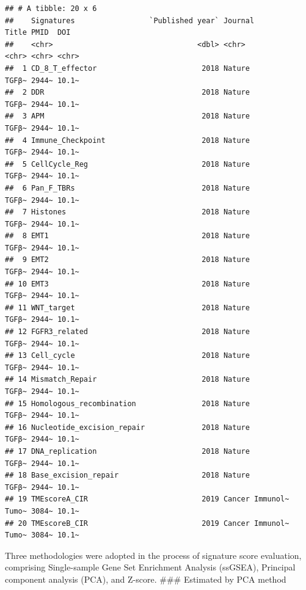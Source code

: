 \documentclass[
  12pt,
]{book}
\theoremstyle{definition}
\theoremstyle{definition}
\theoremstyle{definition}
\theoremstyle{definition}
\theoremstyle{remark}
\begin{document}
\begin{verbatim}
## # A tibble: 20 x 6
##    Signatures                 `Published year` Journal         Title PMID  DOI  
##    <chr>                                 <dbl> <chr>           <chr> <chr> <chr>
##  1 CD_8_T_effector                        2018 Nature          TGFβ~ 2944~ 10.1~
##  2 DDR                                    2018 Nature          TGFβ~ 2944~ 10.1~
##  3 APM                                    2018 Nature          TGFβ~ 2944~ 10.1~
##  4 Immune_Checkpoint                      2018 Nature          TGFβ~ 2944~ 10.1~
##  5 CellCycle_Reg                          2018 Nature          TGFβ~ 2944~ 10.1~
##  6 Pan_F_TBRs                             2018 Nature          TGFβ~ 2944~ 10.1~
##  7 Histones                               2018 Nature          TGFβ~ 2944~ 10.1~
##  8 EMT1                                   2018 Nature          TGFβ~ 2944~ 10.1~
##  9 EMT2                                   2018 Nature          TGFβ~ 2944~ 10.1~
## 10 EMT3                                   2018 Nature          TGFβ~ 2944~ 10.1~
## 11 WNT_target                             2018 Nature          TGFβ~ 2944~ 10.1~
## 12 FGFR3_related                          2018 Nature          TGFβ~ 2944~ 10.1~
## 13 Cell_cycle                             2018 Nature          TGFβ~ 2944~ 10.1~
## 14 Mismatch_Repair                        2018 Nature          TGFβ~ 2944~ 10.1~
## 15 Homologous_recombination               2018 Nature          TGFβ~ 2944~ 10.1~
## 16 Nucleotide_excision_repair             2018 Nature          TGFβ~ 2944~ 10.1~
## 17 DNA_replication                        2018 Nature          TGFβ~ 2944~ 10.1~
## 18 Base_excision_repair                   2018 Nature          TGFβ~ 2944~ 10.1~
## 19 TMEscoreA_CIR                          2019 Cancer Immunol~ Tumo~ 3084~ 10.1~
## 20 TMEscoreB_CIR                          2019 Cancer Immunol~ Tumo~ 3084~ 10.1~
\end{verbatim}

Three methodologies were adopted in the process of signature score evaluation, comprising Single-sample Gene Set Enrichment Analysis (ssGSEA), Principal component analysis (PCA), and Z-score.
\#\#\# Estimated by PCA method
\end{document}
